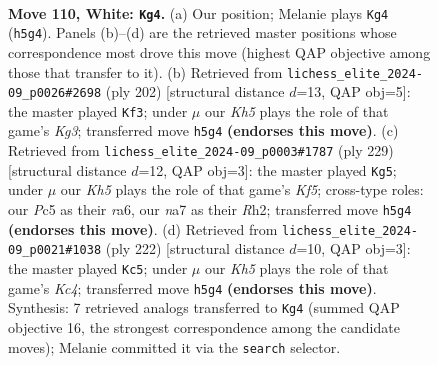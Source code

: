 \documentclass[11pt]{article}
\begin{document}
\clearpage

\begin{figure}[p]\centering
\begin{subfigure}{0.46\textwidth}\centering
\resizebox{\linewidth}{!}{%
\newchessgame
\chessboard[
  setfen={B7/n5k1/8/2P3PK/7P/8/8/8 w - - 1 110},
  showmover=false,
  pgfstyle=straightmove, color=movearrow, markmove={h5-g4}
]}
\caption{}
\end{subfigure}\hfill
\begin{subfigure}{0.46\textwidth}\centering
\resizebox{\linewidth}{!}{%
\newchessgame
\chessboard[
  setfen={8/8/8/6k1/8/6KP/6P1/8 w - - 2 102},
  showmover=false,
  pgfstyle=straightmove, color=movearrow, markmove={g3-f3}
]}
\caption{}
\end{subfigure}
\\[4pt]
\begin{subfigure}{0.46\textwidth}\centering
\resizebox{\linewidth}{!}{%
\newchessgame
\chessboard[
  setfen={8/8/R7/5p2/5k2/5p2/7r/4K3 b - - 87 115},
  showmover=false,
  pgfstyle=straightmove, color=movearrow, markmove={f4-g5}
]}
\caption{}
\end{subfigure}\hfill
\begin{subfigure}{0.46\textwidth}\centering
\resizebox{\linewidth}{!}{%
\newchessgame
\chessboard[
  setfen={8/2k5/8/PP6/2K5/2P5/8/8 w - - 1 112},
  showmover=false,
  pgfstyle=straightmove, color=movearrow, markmove={c4-c5}
]}
\caption{}
\end{subfigure}
\caption{\textbf{Move 110, White: \texttt{Kg4}.} (a) Our position; Melanie plays \texttt{Kg4} (\texttt{h5g4}). Panels (b)--(d) are the retrieved master positions whose correspondence most drove this move (highest QAP objective among those that transfer to it). (b) Retrieved from \texttt{lichess\_elite\_2024-09\_p0026\#2698} (ply 202) [structural distance $d$=13, QAP obj=5]: the master played \texttt{Kf3}; under $\mu$ our \emph{Kh5} plays the role of that game's \emph{Kg3}; transferred move \texttt{h5g4} \textbf{(endorses this move)}. (c) Retrieved from \texttt{lichess\_elite\_2024-09\_p0003\#1787} (ply 229) [structural distance $d$=12, QAP obj=3]: the master played \texttt{Kg5}; under $\mu$ our \emph{Kh5} plays the role of that game's \emph{Kf5}; cross-type roles: our \emph{P}c5 as their \emph{r}a6, our \emph{n}a7 as their \emph{R}h2; transferred move \texttt{h5g4} \textbf{(endorses this move)}. (d) Retrieved from \texttt{lichess\_elite\_2024-09\_p0021\#1038} (ply 222) [structural distance $d$=10, QAP obj=3]: the master played \texttt{Kc5}; under $\mu$ our \emph{Kh5} plays the role of that game's \emph{Kc4}; transferred move \texttt{h5g4} \textbf{(endorses this move)}. Synthesis: 7 retrieved analogs transferred to \texttt{Kg4} (summed QAP objective 16, the strongest correspondence among the candidate moves); Melanie committed it via the \texttt{search} selector.}
\label{fig:thought-m218}
\end{figure}
\end{document}
